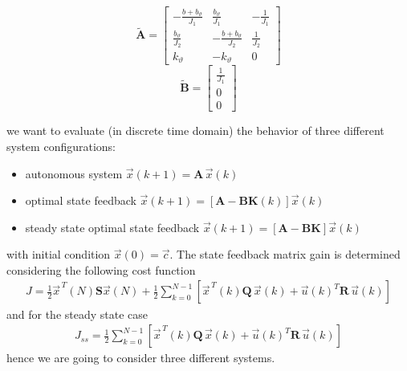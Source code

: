 \documentclass[12pt,a4paper,oneside]{book}
\begin{document}
\begin{onehalfspace}
\begin{mybox}
	\begin{equation*}
		\tilde{\mathbf{A}} =
		\begin{bmatrix}
			-\frac{b+b_{\vartheta}}{J_1} & \frac{b_{\vartheta}}{J_1} & 
			-\frac{1}{J_1}\\[6pt]
			\frac{b_{\vartheta}}{J_2} & -\frac{b+b_{\vartheta}}{J_2} & 
			\frac{1}{J_2}\\[6pt]
			k_{\vartheta} & -k_{\vartheta} & 0
		\end{bmatrix}
	\end{equation*}
	\begin{equation*}
		\tilde{\mathbf{B}} = 
		\begin{bmatrix}
			\frac{1}{J_1} \\[6pt]
			0 \\[6pt]
			0
		\end{bmatrix}
	\end{equation*}
\end{mybox}

we want to evaluate (in discrete time domain) the behavior of three different 
system configurations:
\begin{itemize}
	\item autonomous system $\vec{x}(k+1)=\mathbf{A}\,\vec{x}(k)$
	\item optimal state feedback $\vec{x}(k+1)=\left[ 
	\mathbf{A}-\mathbf{B}\mathbf{K}(k)\right] \vec{x}(k) $
	\item steady state optimal state feedback $\vec{x}(k+1)=\left[ 
	\mathbf{A}-\mathbf{B}\mathbf{K}\right] \vec{x}(k) $
\end{itemize}
with initial condition $\vec{x}(0)=\vec{c}$. The state feedback matrix gain is 
determined  considering the following cost function
\begin{equation*}
	\begin{aligned}
		J = 
		\frac{1}{2}\vec{x}^{\,T}(N)\mathbf{S}\vec{x}(N)+\frac{1}{2}\sum_{k=0}^{N-1}\left[
		\vec{x}^{\,T}(k)\mathbf{Q}\,\vec{x}(k) + 
		\vec{u}(k)^T\mathbf{R}\,\vec{u}(k)\right]  
	\end{aligned}
\end{equation*}
and for the steady state case
\begin{equation*}
	\begin{aligned}
		J_{ss} = \frac{1}{2}\sum_{k=0}^{N-1}\left[ 
		\vec{x}^{\,T}(k)\mathbf{Q}\,\vec{x}(k) + 
		\vec{u}(k)^T\mathbf{R}\,\vec{u}(k)\right]  
	\end{aligned}
\end{equation*}
hence we are going to consider three different systems.
\vspace{10mm}


\end{onehalfspace}
\end{document}

